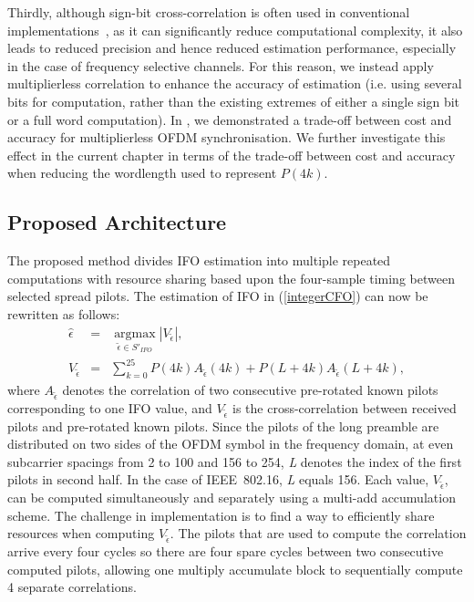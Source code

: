Thirdly, although sign-bit cross-correlation is often used in conventional implementations~\cite{Kim2008,Schwoerer2002}, as it can significantly reduce computational complexity, it also leads to reduced precision and hence reduced estimation performance, especially in the case of frequency selective channels.
For this reason, we instead apply multiplierless correlation to enhance the accuracy of estimation (i.e. using several bits for computation, rather than the existing extremes of either a single sign bit or a full word computation).
In \cite{Pham2012}, we demonstrated a trade-off between cost and accuracy for multiplierless OFDM synchronisation.
We further investigate this effect in the current chapter in terms of the trade-off between cost and accuracy when reducing the wordlength used to represent $P(4k)$.

\subsection{Proposed Architecture}
\label{subsec:Imple}
The proposed method divides IFO estimation into multiple repeated computations with resource sharing based upon the four-sample timing between selected spread pilots.
The estimation of IFO in (\ref{integerCFO}) can now be rewritten as follows:
\begin{eqnarray}
\label{proposedimplementIFO}
\hat{\epsilon}  &=&\underset{\tilde{\epsilon} \in S'_{IFO}}{\operatorname{argmax}}  \left|V_{\tilde{\epsilon}}  \right|,	 \nonumber \\
V_{\tilde{\epsilon}} &=& \sum_{k=0}^{25} P(4k) A_{\tilde{\epsilon}}(4k) + P(L+4k)  A_{\tilde{\epsilon}}(L+4k),
\end{eqnarray}
where $A_{\tilde{\epsilon}}$ denotes the correlation of two consecutive pre-rotated known pilots corresponding to one IFO value, and $V_{\tilde{\epsilon}}$ is the cross-correlation between received pilots and pre-rotated known pilots.
Since the pilots of the long preamble are distributed on two sides of the OFDM symbol in the frequency domain, at even subcarrier spacings from 2 to 100 and 156 to 254, \emph{L} denotes the index of the first pilots in second half.
In the case of IEEE~802.16, \emph{L} equals 156.
Each value, $V_{\tilde{\epsilon}}$, can be computed simultaneously and separately using a multi-add accumulation scheme.
The challenge in implementation is to find a way to efficiently share resources when computing $V_{\tilde{\epsilon}}$.
The pilots that are used to compute the correlation arrive every four cycles so there are four spare cycles between two consecutive computed pilots, allowing one multiply accumulate block to sequentially compute 4 separate correlations.

